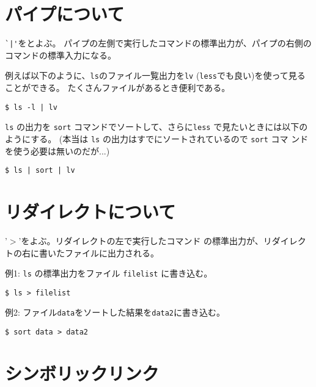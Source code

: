 \documentclass{jreport}
\begin{document}
\section{パイプについて}
\verb-`|'-をとよぶ。
パイプの左側で実行したコマンドの標準出力が、パイプの右側のコマンドの標準入力になる。

例えば以下のように、\verb|ls|のファイル一覧出力を\verb|lv|
(\verb|less|でも良い)を使って見ることができる。
たくさんファイルがあるとき便利である。
\begin{screen}
\begin{verbatim}
$ ls -l | lv
\end{verbatim}
\end{screen}
\verb|ls| の出力を \verb|sort| コマンドでソートして、さらに\verb|less|
で見たいときには以下のようにする。
(本当は \verb|ls| の出力はすでにソートされているので \verb|sort| コマ
ンドを使う必要は無いのだが...)
\begin{screen}
\begin{verbatim}
$ ls | sort | lv
\end{verbatim}
\end{screen}

\section{リダイレクトについて}

'$>$'をよぶ。リダイレクトの左で実行したコマンド
の標準出力が、リダイレクトの右に書いたファイルに出力される。

\begin{list}{}{}
\item [例1:] \verb|ls| の標準出力をファイル \verb|filelist| に書き込む。
\begin{screen}
\begin{verbatim}
$ ls > filelist
\end{verbatim}
\end{screen}
\item [例2:] ファイル\verb|data|をソートした結果を\verb|data2|に書き込む。
\begin{screen}
\begin{verbatim}
$ sort data > data2
\end{verbatim}
\end{screen}
\end{list}

\section{シンボリックリンク}
\end{document}
